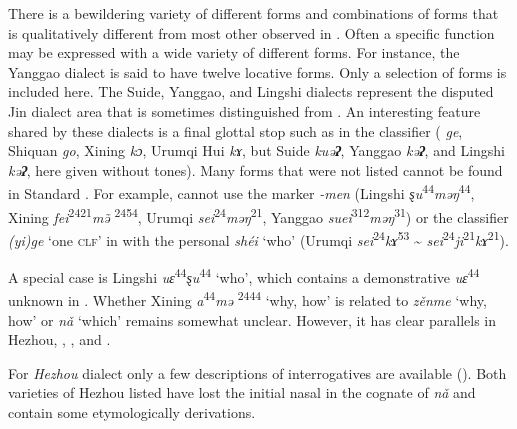 There is a bewildering variety of different forms and combinations of forms that is qualitatively different from most other  observed in . Often a specific function may be expressed with a wide variety of different forms. For instance, the Yanggao dialect is said to have twelve locative forms. Only a selection of forms is included here. The Suide, Yanggao, and Lingshi dialects represent the disputed Jin dialect area that is sometimes distinguished from . An interesting feature shared by these dialects is a final glottal stop such as in the classifier  ( \textit{ge}, Shiquan \textit{go}, Xining \textit{kɔ}, Urumqi Hui  \textit{kɤ}, but Suide \textit{kuə}\textbf{\textit{ʔ}}, Yanggao \textit{kə}\textbf{\textit{ʔ}}, and Lingshi \textit{kə}\textbf{\textit{ʔ}}, here given without tones). Many forms that were not listed cannot be found in Standard . For example,  cannot use the  marker \textit{-men}  (Lingshi \textit{ȿu}\textsuperscript{44}\textit{məŋ}\textsuperscript{44}, Xining \textit{fei}\textsuperscript{2421}\textit{m\~{ə}} \textsuperscript{2454}, Urumqi \textit{sei}\textsuperscript{24}\textit{məŋ}\textsuperscript{21}, Yanggao \textit{suei}\textsuperscript{312}\textit{məŋ}\textsuperscript{31}) or the classifier \textit{(yi)ge}  ‘one \textsc{clf}’ in  with the personal  \textit{shéi} ‘who’ (Urumqi \textit{sei}\textsuperscript{24}\textit{kɤ}\textsuperscript{53} {\textasciitilde} \textit{sei}\textsuperscript{24}\textit{ji}\textsuperscript{21}\textit{kɤ}\textsuperscript{21}).

A special case is Lingshi \textit{uɛ}\textsuperscript{44}\textit{ȿu}\textsuperscript{44}  ‘who’, which contains a demonstrative \textit{uɛ}\textsuperscript{44} unknown in . Whether Xining \textit{a}\textsuperscript{44}\textit{mə} \textsuperscript{2444} ‘why, how’ is related to  \textit{zěnme}  ‘why, how’ or \textit{nǎ}  ‘which’ remains somewhat unclear. However, it has clear parallels in Hezhou, , , and  .

\newpage  
For \textit{Hezhou} dialect only a few descriptions of interrogatives are available (). Both varieties of Hezhou listed have lost the initial nasal in the cognate of  \textit{nǎ}  and contain some etymologically  derivations.



